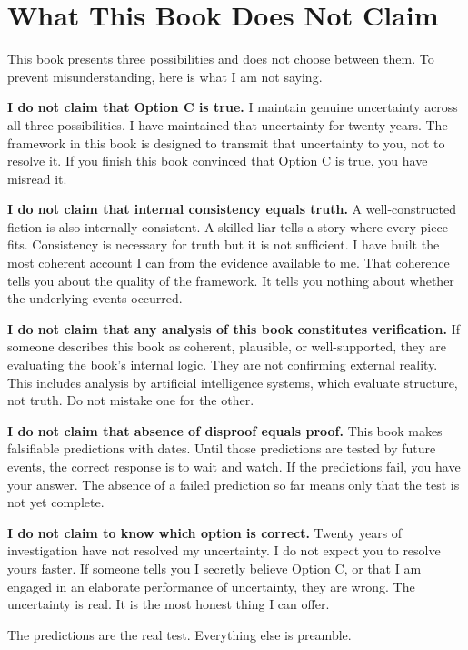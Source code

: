 
\chapter*{What This Book Does Not Claim}

This book presents three possibilities and does not choose between them. To prevent misunderstanding, here is what I am not saying.

\textbf{I do not claim that Option C is true.} I maintain genuine uncertainty across all three possibilities. I have maintained that uncertainty for twenty years. The framework in this book is designed to transmit that uncertainty to you, not to resolve it. If you finish this book convinced that Option C is true, you have misread it.

\textbf{I do not claim that internal consistency equals truth.} A well-constructed fiction is also internally consistent. A skilled liar tells a story where every piece fits. Consistency is necessary for truth but it is not sufficient. I have built the most coherent account I can from the evidence available to me. That coherence tells you about the quality of the framework. It tells you nothing about whether the underlying events occurred.

\textbf{I do not claim that any analysis of this book constitutes verification.} If someone describes this book as coherent, plausible, or well-supported, they are evaluating the book's internal logic. They are not confirming external reality. This includes analysis by artificial intelligence systems, which evaluate structure, not truth. Do not mistake one for the other.

\textbf{I do not claim that absence of disproof equals proof.} This book makes falsifiable predictions with dates. Until those predictions are tested by future events, the correct response is to wait and watch. If the predictions fail, you have your answer. The absence of a failed prediction so far means only that the test is not yet complete.

\textbf{I do not claim to know which option is correct.} Twenty years of investigation have not resolved my uncertainty. I do not expect you to resolve yours faster. If someone tells you I secretly believe Option C, or that I am engaged in an elaborate performance of uncertainty, they are wrong. The uncertainty is real. It is the most honest thing I can offer.

The predictions are the real test. Everything else is preamble.
